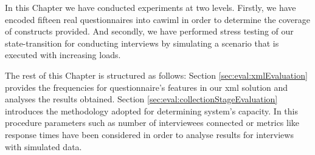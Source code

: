 	In this Chapter we have conducted experiments at two levels. Firstly, we have encoded fifteen real questionnaires into \gls{cawiml} in order to determine the coverage of constructs provided. And secondly, we have performed stress testing of our state-transition for conducting interviews by simulating a scenario that is executed with increasing loads.

	The rest of this Chapter is structured as follows: Section \ref{sec:eval:xmlEvaluation} provides the frequencies for questionnaire's features in our \gls{xml} solution and analyses the results obtained. Section \ref{sec:eval:collectionStageEvaluation} introduces the methodology adopted for determining system's capacity. In this procedure parameters such as number of interviewees connected or metrics like response times have been considered in order to analyse results for interviews with simulated data.